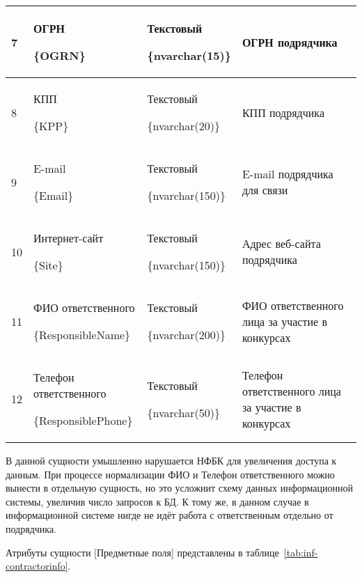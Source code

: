 \begin{footnotesize}
\begin{longtable}[h]{|p{}|p{}|p{}|p{}|}
	7 & ОГРН \par \{OGRN\} & Текстовый \par \{nvarchar(15)\} & ОГРН подрядчика \\ \hline
	8 & КПП \par \{KPP\} & Текстовый \par \{nvarchar(20)\} & КПП подрядчика \\ \hline
	9 & E-mail \par \{Email\} & Текстовый \par \{nvarchar(150)\} & E-mail подрядчика для связи \\ \hline
	10 & Интернет-сайт \par \{Site\} & Текстовый \par \{nvarchar(150)\} & Адрес веб-сайта подрядчика \\ \hline
	11 & ФИО ответственного \par \{ResponsibleName\} & Текстовый \par \{nvarchar(200)\} & ФИО ответственного лица за участие в конкурсах \\ \hline
	12 & Телефон ответственного \par \{ResponsiblePhone\} & Текстовый \par \{nvarchar(50)\} & Телефон ответственного лица за участие в конкурсах \\ \hline
\end{longtable}
\end{footnotesize}

В данной сущности умышленно нарушается НФБК для увеличения доступа к данным.
При процессе нормализации ФИО и Телефон ответственного можно вынести в отдельную сущность, но это усложнит схему данных информационной системы, увеличив число запросов к БД.
К тому же, в данном случае в информационной системе нигде не идёт работа с ответственным отдельно от подрядчика.

Атрибуты сущности [Предметные поля] представлены в таблице~\ref{tab:inf-contractorinfo}.

